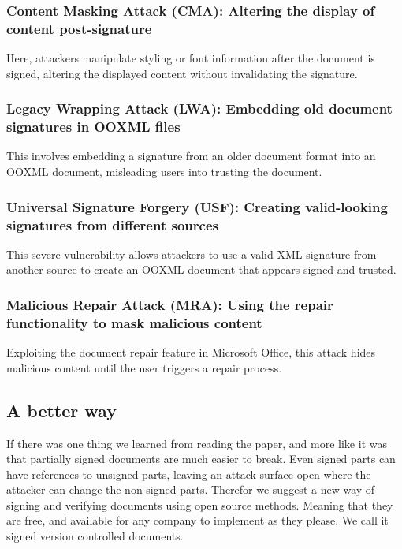 \documentclass[conference]{IEEEtran}
\begin{document}
        \subsubsection{Content Masking Attack (CMA): Altering the display of content post-signature}
            Here, attackers manipulate styling or font information after the document is signed, altering the displayed content without invalidating the signature.

        \subsubsection{Legacy Wrapping Attack (LWA): Embedding old document signatures in OOXML files}
            This involves embedding a signature from an older document format into an OOXML document, misleading users into trusting the document.
        
        \subsubsection{Universal Signature Forgery (USF): Creating valid-looking signatures from different sources}
            This severe vulnerability allows attackers to use a valid XML signature from another source to create an OOXML document that appears signed and trusted.
        
        \subsubsection{Malicious Repair Attack (MRA): Using the repair functionality to mask malicious content}
            Exploiting the document repair feature in Microsoft Office, this attack hides malicious content until the user triggers a repair process.
        
    \subsection{A better way}
        If there was one thing we learned from reading the paper, and more like it\cite{shadow-attacks} was that partially signed documents are much easier to break. Even signed parts can have references to unsigned parts, leaving an attack surface open where the attacker can change the non-signed parts\cite{PDF-Digital-Signatures-Encryption}. Therefor we suggest a new way of signing and verifying documents using open source methods. Meaning that they are free, and available for any company to implement as they please. We call it signed version controlled documents.
        
\end{document}

